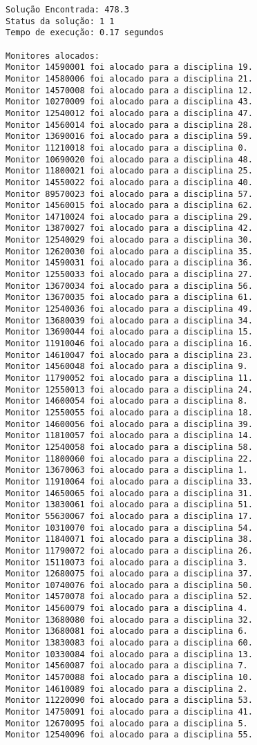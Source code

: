 \documentclass[a4paper,12pt]{article}
\begin{document}
\begin{lstlisting}[breaklines=true]
Solução Encontrada: 478.3
Status da solução: 1 1
Tempo de execução: 0.17 segundos

Monitores alocados:
Monitor 14590001 foi alocado para a disciplina 19.
Monitor 14580006 foi alocado para a disciplina 21.
Monitor 14570008 foi alocado para a disciplina 12.
Monitor 10270009 foi alocado para a disciplina 43.
Monitor 12540012 foi alocado para a disciplina 47.
Monitor 14560014 foi alocado para a disciplina 28.
Monitor 13690016 foi alocado para a disciplina 59.
Monitor 11210018 foi alocado para a disciplina 0.
Monitor 10690020 foi alocado para a disciplina 48.
Monitor 11800021 foi alocado para a disciplina 25.
Monitor 14550022 foi alocado para a disciplina 40.
Monitor 89570023 foi alocado para a disciplina 57.
Monitor 14560015 foi alocado para a disciplina 62.
Monitor 14710024 foi alocado para a disciplina 29.
Monitor 13870027 foi alocado para a disciplina 42.
Monitor 12540029 foi alocado para a disciplina 30.
Monitor 12620030 foi alocado para a disciplina 35.
Monitor 14590031 foi alocado para a disciplina 36.
Monitor 12550033 foi alocado para a disciplina 27.
Monitor 13670034 foi alocado para a disciplina 56.
Monitor 13670035 foi alocado para a disciplina 61.
Monitor 12540036 foi alocado para a disciplina 49.
Monitor 13680039 foi alocado para a disciplina 34.
Monitor 13690044 foi alocado para a disciplina 15.
Monitor 11910046 foi alocado para a disciplina 16.
Monitor 14610047 foi alocado para a disciplina 23.
Monitor 14560048 foi alocado para a disciplina 9.
Monitor 11790052 foi alocado para a disciplina 11.
Monitor 12550013 foi alocado para a disciplina 24.
Monitor 14600054 foi alocado para a disciplina 8.
Monitor 12550055 foi alocado para a disciplina 18.
Monitor 14600056 foi alocado para a disciplina 39.
Monitor 11810057 foi alocado para a disciplina 14.
Monitor 12540058 foi alocado para a disciplina 58.
Monitor 11800060 foi alocado para a disciplina 22.
Monitor 13670063 foi alocado para a disciplina 1.
Monitor 11910064 foi alocado para a disciplina 33.
Monitor 14650065 foi alocado para a disciplina 31.
Monitor 13830061 foi alocado para a disciplina 51.
Monitor 55630067 foi alocado para a disciplina 17.
Monitor 10310070 foi alocado para a disciplina 54.
Monitor 11840071 foi alocado para a disciplina 38.
Monitor 11790072 foi alocado para a disciplina 26.
Monitor 15110073 foi alocado para a disciplina 3.
Monitor 12680075 foi alocado para a disciplina 37.
Monitor 10740076 foi alocado para a disciplina 50.
Monitor 14570078 foi alocado para a disciplina 52.
Monitor 14560079 foi alocado para a disciplina 4.
Monitor 13680080 foi alocado para a disciplina 32.
Monitor 13680081 foi alocado para a disciplina 6.
Monitor 13830083 foi alocado para a disciplina 60.
Monitor 10330084 foi alocado para a disciplina 13.
Monitor 14560087 foi alocado para a disciplina 7.
Monitor 14570088 foi alocado para a disciplina 10.
Monitor 14610089 foi alocado para a disciplina 2.
Monitor 11220090 foi alocado para a disciplina 53.
Monitor 14750091 foi alocado para a disciplina 41.
Monitor 12670095 foi alocado para a disciplina 5.
Monitor 12540096 foi alocado para a disciplina 55.


\end{lstlisting}
\end{document}
